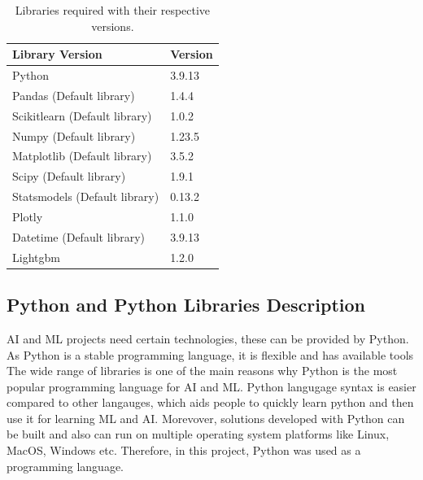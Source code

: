 

\begin{table}[ht]
	\caption[Libraries required with their respective versions]{Libraries required with their respective versions.} %
	\centering %
\begin{tabular}{|l|l|}
	\hline
	\textbf{Library Version} & \textbf{Version} \\ \hline
	Python & 3.9.13 \\ \hline
	Pandas (Default library) & 1.4.4 \\ \hline
	Scikitlearn (Default library) & 1.0.2 \\ \hline
	Numpy (Default library) & 1.23.5 \\ \hline
	Matplotlib (Default library) & 3.5.2 \\ \hline
	Scipy (Default library) & 1.9.1 \\ \hline
	Statsmodels (Default library) & 0.13.2 \\ \hline
	Plotly & 1.1.0 \\ \hline
	Datetime (Default library) & 3.9.13 \\ \hline
	Lightgbm & 1.2.0 \\ \hline
\end{tabular}
	\label{table:PDF} %
\end{table}

\subsection{Python and Python Libraries Description }

AI and ML projects need certain technologies, these can be provided by Python. As Python is a stable programming language, it is flexible and has available tools The wide range of libraries is one of the main reasons why Python is the most popular programming language for AI and ML. Python langugage syntax is easier compared to other langauges, which aids people to quickly learn python and then use it for learning ML and AI. Morevover, solutions developed with Python can be built and also can run on multiple operating system platforms like Linux, MacOS, Windows etc. Therefore, in this project, Python was used as a programming language.\\

